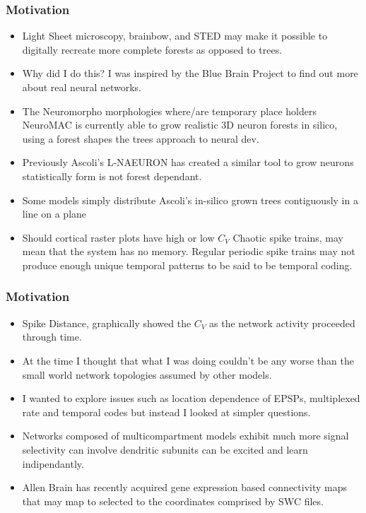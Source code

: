\documentclass{beamer}
\begin{document}
\begin{frame}
\frametitle{Motivation}%
\begin{itemize}

\vfill \item Light Sheet microscopy, brainbow, and STED may make it possible to digitally recreate more complete forests as opposed to trees.
\vfill\item Why did I do this? I was inspired by the Blue Brain Project to find out more about real neural networks.
\vfill\item The Neuromorpho morphologies where/are temporary place holders NeuroMAC is currently able to grow realistic 3D neuron forests in silico, using a forest shapes the trees approach to neural dev.
\vfill\item Previously Ascoli's L-NAEURON has created a similar tool to grow neurons statistically form is not forest dependant.
\vfill\item Some models simply distribute Ascoli's in-silico grown trees contiguously in a line on a plane
\vfill\item Should cortical raster plots have high or low $ C_{V} $ Chaotic spike trains, may mean that the system has no memory. Regular periodic spike trains may not produce enough unique temporal patterns to be said to be temporal coding.
\end{itemize}
\end{frame}
\begin{frame}
\frametitle{Motivation}%
\begin{itemize}

\vfill\item Spike Distance, graphically showed the $C_{V}$ as the network activity proceeded through time. 
\vfill\item At the time I thought that what I was doing couldn't be any worse than the small world network topologies assumed by other models.
\vfill\item I wanted to explore issues such as location dependence of EPSPs, multiplexed rate and temporal codes but instead I looked at simpler questions.
\vfill\item Networks composed of multicompartment models exhibit much more signal selectivity can involve dendritic subunits can be excited and learn indipendantly.
\vfill\item Allen Brain has recently acquired gene expression based connectivity maps that may map to selected to the coordinates comprised by SWC files.
\end{itemize}
\end{frame}
\end{document}
